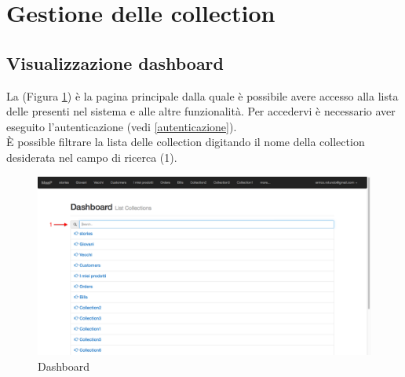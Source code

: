 \clearpage
\section{Gestione delle collection}

	\subsection{Visualizzazione dashboard} %
	\label{visualizzazionedashboard}
			La  (Figura \ref{fig:dashboard}) è la pagina principale dalla quale è possibile avere accesso alla lista delle  presenti nel sistema e alle altre funzionalità. Per accedervi è necessario aver eseguito l'autenticazione (vedi \ref{autenticazione}). \\
			\`E possible filtrare la lista delle collection digitando il nome della collection desiderata nel campo di ricerca (1).

			\begin{figure}[H]
				\centering \includegraphics[width=1\textwidth]{img/dashboard.png}
			\caption{\label{fig:dashboard} Dashboard}
			\end{figure}
	
	\clearpage
